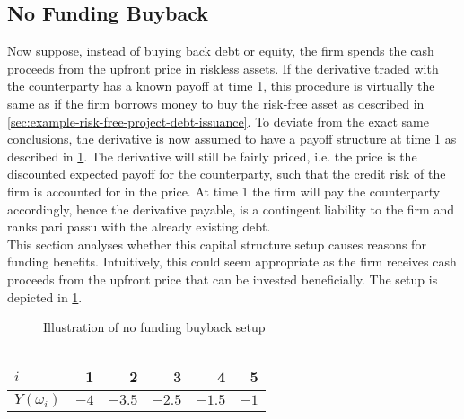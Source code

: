 \documentclass[main.tex]{subfiles}
\begin{document}
        \subsection{No Funding Buyback}
            Now suppose, instead of buying back debt or equity, 
            the firm spends the cash proceeds from the upfront price in riskless assets. 
            If the derivative traded with the counterparty has a known payoff at time 1, this procedure is virtually the same as if the firm borrows money to buy the risk-free asset 
            as described in \cref{sec:example-risk-free-project-debt-issuance}. 
            To deviate from the exact same conclusions, the derivative is now assumed to have a payoff structure at time 1 
            as described in \cref{tbl:risky-option-payoff}. 
            The derivative will still be fairly priced, i.e. the price is the discounted expected payoff for the counterparty, 
            such that the credit risk of the firm is accounted for in the price. 
            At time 1 the firm will pay the counterparty accordingly, hence the derivative payable, 
            is a contingent liability to the firm and ranks pari passu with the already existing debt.
            \\
            This section analyses whether this capital structure setup causes reasons for funding benefits.
            Intuitively, this could seem appropriate as the firm receives cash proceeds from the upfront price that can be invested beneficially.
            The setup is depicted in \cref{fig:no-funding-buyback-setup}.
            \begin{figure}[t]
                \centering
                \caption{Illustration of no funding buyback setup}
                \label{fig:no-funding-buyback-setup}
            \end{figure}
            \begin{table}[H]
                \centering
                \begin{tabular}{l|rrrrr}
                    $i$ & 1 & 2 & 3 & 4 & 5 \\
                    \hline
                    $Y(\omega_{i})$ & $\num{-4}$ & $\num{-3.5}$ & $\num{-2.5}$ & $\num{-1.5}$ & $\num{-1}$ \\
                \end{tabular}
                \caption{}
                \label{tbl:risky-option-payoff}
            \end{table}
\end{document}
